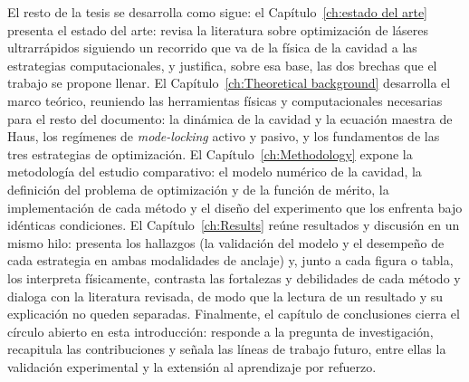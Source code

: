 El resto de la tesis se desarrolla como sigue: el Capítulo~\ref{ch:estado del arte} presenta el estado del arte: revisa la literatura sobre optimización de láseres ultrarrápidos siguiendo un recorrido que va de la física de la cavidad a las estrategias computacionales, y justifica, sobre esa base, las dos brechas que el trabajo se propone llenar. El Capítulo~\ref{ch:Theoretical background} desarrolla el marco teórico, reuniendo las herramientas físicas y computacionales necesarias para el resto del documento: la dinámica de la cavidad y la ecuación maestra de Haus, los regímenes de \emph{mode-locking} activo y pasivo, y los fundamentos de las tres estrategias de optimización. El Capítulo~\ref{ch:Methodology} expone la metodología del estudio comparativo: el modelo numérico de la cavidad, la definición del problema de optimización y de la función de mérito, la implementación de cada método y el diseño del experimento que los enfrenta bajo idénticas condiciones. El Capítulo~\ref{ch:Results} reúne resultados y discusión en un mismo hilo: presenta los hallazgos (la validación del modelo y el desempeño de cada estrategia en ambas modalidades de anclaje) y, junto a cada figura o tabla, los interpreta físicamente, contrasta las fortalezas y debilidades de cada método y dialoga con la literatura revisada, de modo que la lectura de un resultado y su explicación no queden separadas. Finalmente, el capítulo de conclusiones cierra el círculo abierto en esta introducción: responde a la pregunta de investigación, recapitula las contribuciones y señala las líneas de trabajo futuro, entre ellas la validación experimental y la extensión al aprendizaje por refuerzo.